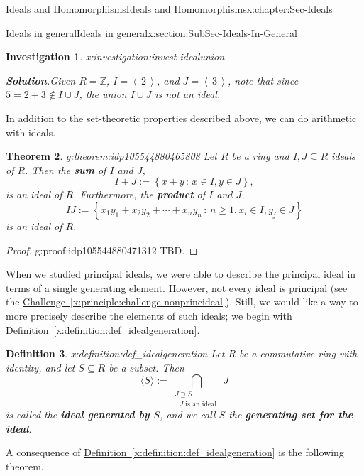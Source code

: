 \documentclass[oneside,10pt,]{book}
\newcommand{\blocktitlefont}{\relax}
\newcommand{\xreffont}{\relax}
\newcommand{\terminology}[1]{\textbf{#1}}
\numberwithin{equation}{section}
\renewcommand{\ge}{\geqslant}
\newcommand{\ideal}[1]{\left\langle\, #1 \,\right\rangle}
\newcommand{\setof}[2]{{\left\{#1\,\colon\,#2\right\}}}
\def\Z{{\mathbb Z}}
\newtheorem{theorem}{Theorem}[section]
\newtheorem{definition}[theorem]{Definition}
\newtheorem{investigation}[theorem]{Investigation}
\begin{document}
\begin{chapterptx}{Ideals and Homomorphisms}{}{Ideals and Homomorphisms}{}{}{x:chapter:Sec-Ideals}
\begin{sectionptx}{Ideals in general}{}{Ideals in general}{}{}{x:section:SubSec-Ideals-In-General}
\begin{investigation}{}{x:investigation:invest-idealunion}
\par\smallskip%
\noindent\textbf{\blocktitlefont Solution}.\hypertarget{g:solution:idp105544880463248}{}\quad{}Given \(R = \Z\), \(I = \ideal{2}\), and \(J = \ideal{3}\), note that since \(5 = 2 + 3\notin I\cup J\), the union \(I\cup J\) is not an ideal.%
\end{investigation}%
In addition to the set-theoretic properties described above, we can do arithmetic with ideals.%
\begin{theorem}{}{}{g:theorem:idp105544880465808}%
Let \(R\) be a ring and \(I,J\subseteq R\) ideals of \(R\). Then the \terminology{sum} of \(I\) and \(J\),%
\begin{equation*}
I+J := \setof{x+y}{x\in I, y\in J},
\end{equation*}
is an ideal of \(R\). Furthermore, the \terminology{product} of \(I\) and \(J\),%
\begin{equation*}
IJ := \setof{x_1 y_1 + x_2 y_2 + \cdots + x_n y_n}{n\ge 1, x_i \in I, y_j\in J}
\end{equation*}
is an ideal of \(R\).%
\end{theorem}
\begin{proof}{}{g:proof:idp105544880471312}
TBD.\end{proof}
When we studied principal ideals, we were able to describe the principal ideal in terms of a single generating element. However, not every ideal is principal (see the \hyperref[x:principle:challenge-nonprincideal]{Challenge~{\xreffont\ref{x:principle:challenge-nonprincideal}}}). Still, we would like a way to more precisely describe the elements of such ideals; we begin with \hyperref[x:definition:def_idealgeneration]{Definition~{\xreffont\ref{x:definition:def_idealgeneration}}}.%
\begin{definition}{}{x:definition:def_idealgeneration}%
Let \(R\) be a commutative ring with identity, and let \(S\subseteq R\) be a subset. Then%
\begin{equation}
\langle S \rangle := \bigcap\limits_{\substack{J\supseteq S\\\text{ \(J\) is an ideal } } } J\label{x:men:eq_idealgeneratedbyset}
\end{equation}
is called the \terminology{ideal generated by \(S\)}, and we call \(S\) the \terminology{generating set for the ideal}.%
\end{definition}
A consequence of \hyperref[x:definition:def_idealgeneration]{Definition~{\xreffont\ref{x:definition:def_idealgeneration}}} is the following theorem.%

\end{sectionptx}
\end{chapterptx}
\end{document}
